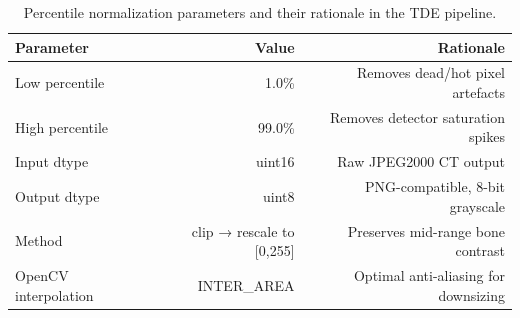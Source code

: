 \begin{table}[htbp]
\caption{Percentile normalization parameters and their rationale in the TDE pipeline.}
\label{tab:normalization}
\begin{tabular}{lrr}
\toprule
Parameter & Value & Rationale \\
\midrule
Low percentile & 1.0\% & Removes dead/hot pixel artefacts \\
High percentile & 99.0\% & Removes detector saturation spikes \\
Input dtype & uint16 & Raw JPEG2000 CT output \\
Output dtype & uint8 & PNG-compatible, 8-bit grayscale \\
Method & clip → rescale to [0,255] & Preserves mid-range bone contrast \\
OpenCV interpolation & INTER\_AREA & Optimal anti-aliasing for downsizing \\
\bottomrule
\end{tabular}
\end{table}
